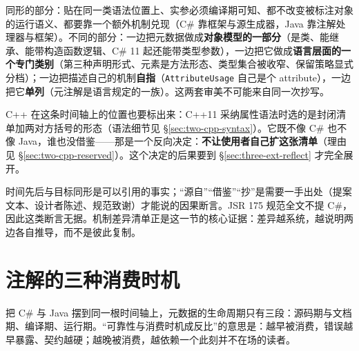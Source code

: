 \documentclass[12pt,a4paper,fontset=fandol]{ctexbook}
\newcommand{\cpp}[1]{C++#1}
\begin{document}
\begin{compare}[title={同形，但不是同源}]
同形的部分：贴在同一类语法位置上、实参必须编译期可知、都不改变被标注对象的运行语义、都要靠一个额外机制兑现（C\# 靠框架与源生成器，Java 靠注解处理器与框架）。不同的部分：一边把元数据做成\textbf{对象模型的一部分}（是类、能继承、能带构造函数逻辑、C\# 11 起还能带类型参数），一边把它做成\textbf{语言层面的一个专门类别}（第三种声明形式、元素是方法形态、类型集合被收窄、保留策略显式分档）；一边把描述自己的机制\textbf{自指}（\texttt{AttributeUsage} 自己是个 attribute），一边把它\textbf{单列}（元注解是语言规定的一族）。这两套审美不可能来自同一次抄写。
\end{compare}

\cpp{} 在这条时间轴上的位置也要标出来：\cpp{11} 采纳属性语法时选的是封闭清单加两对方括号的形态（语法细节见 \S\ref{sec:two-cpp-syntax}）。它既不像 C\# 也不像 Java，谁也没借鉴——那是一个反向决定：\textbf{不让使用者自己扩这张清单}（理由见 \S\ref{sec:two-cpp-reserved}）。这个决定的后果要到 \S\ref{sec:three-ext-reflect} 才完全展开。

\begin{guideline}[title={证据边界：说到“同期同形”就停}]
时间先后与目标同形是可以引用的事实；“源自”“借鉴”“抄”是需要一手出处（提案文本、设计者陈述、规范致谢）才能说的因果断言。JSR 175 规范全文不提 C\#，因此这类断言无据。机制差异清单正是这一节的核心证据：差异越系统，越说明两边各自推导，而不是彼此复制。
\end{guideline}

\section{注解的三种消费时机}
\label{sec:three-retention}

把 C\# 与 Java 摆到同一根时间轴上，元数据的生命周期只有三段：源码期与文档期、编译期、运行期。“可靠性与消费时机成反比”的意思是：越早被消费，错误越早暴露、契约越硬；越晚被消费，越依赖一个此刻并不在场的读者。
\end{document}
